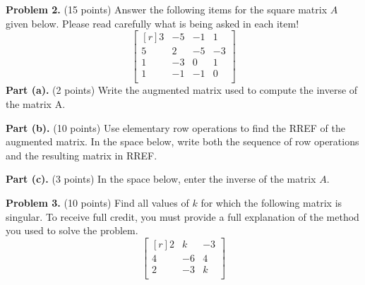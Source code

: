 \documentclass[12pt]{article}
\begin{document}
\clearpage


\textbf{Problem 2.} (15 points) Answer the following items for the square matrix $A$ given below. Please read carefully what is being asked in each item!
\[
\begin{bmatrix*}[r]3&-5&-1&1\\5&2&-5&-3\\1&-3&0&1\\1&-1&-1&0\\\end{bmatrix*}
\]
\textbf{Part (a).} (2 points) Write the augmented matrix used to compute the inverse of the matrix A.

\vskip1.5in

\textbf{Part (b).} (10 points) Use elementary row operations to find the RREF of the augmented matrix.
In the space below, write both the sequence of row operations and the resulting matrix in RREF.

\vskip3.5in

\textbf{Part (c).} (3 points) In the space below, enter the inverse of the matrix $A$.

\clearpage

\textbf{Problem 3.} (10 points) Find all values of $k$ for which the following matrix is singular. To receive full credit, you must provide a full explanation of the method you used to solve the problem.
\[
\begin{bmatrix*}[r]2&k&-3\\4&-6&4\\2&-3&k\\\end{bmatrix*}
\]

\clearpage
\end{document}
